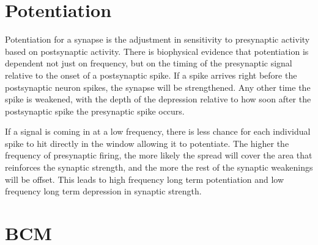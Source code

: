 \documentclass[12pt]{article}
\begin{document}
\maketitle

\section{Potentiation}

Potentiation for a synapse is the adjustment in sensitivity to presynaptic activity based on postsynaptic activity.  There is biophysical evidence that potentiation is dependent not just on frequency, but on the timing of the presynaptic signal relative to the onset of a postsynaptic spike.  If a spike arrives right before the postsynaptic neuron spikes, the synapse will be strengthened.  Any other time the spike is weakened, with the depth of the depression relative to how soon after the postsynaptic spike the presynaptic spike occurs.  

If a signal is coming in at a low frequency, there is less chance for each individual spike to hit directly in the window allowing it to potentiate.  The higher the frequency of presynaptic firing, the more likely the spread will cover the area that reinforces the synaptic strength, and the more the rest of the synaptic weakenings will be offset.  This leads to high frequency long term potentiation and low frequency long term depression in synaptic strength.

\section{BCM}
\end{document}
